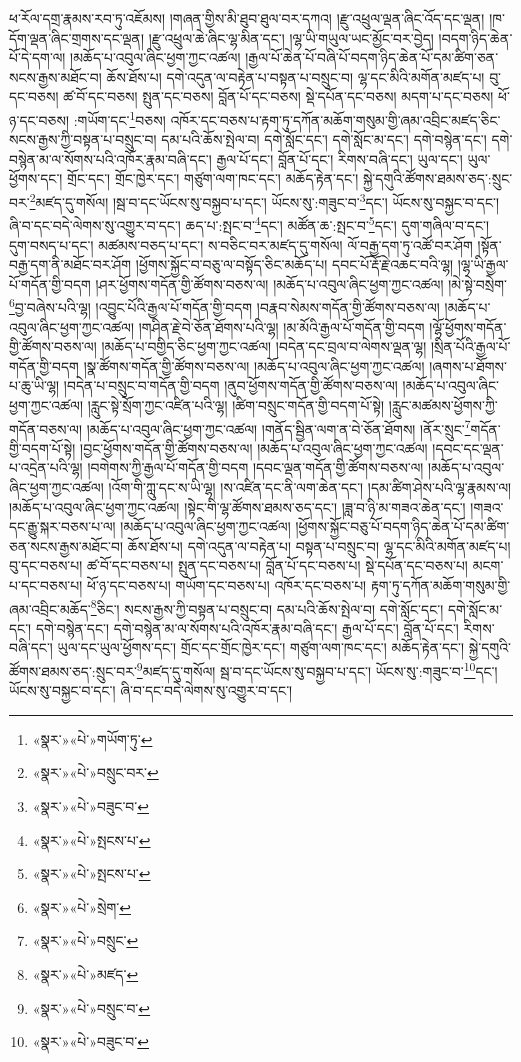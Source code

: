 ཕ་རོལ་དགྲ་རྣམས་རབ་ཏུ་འཇོམས། །གཞན་གྱིས་མི་ཐུབ་ཐུལ་བར་དཀའ། །རྫུ་འཕྲུལ་ལྡན་ཞིང་འོད་དང་ལྡན། །ཁ་དོག་ལྡན་ཞིང་གྲགས་དང་ལྡན། །རྫུ་འཕྲུལ་ཆེ་ཞིང་ལྷ་མིན་དང་། །ལྷ་ཡི་གཡུལ་ཡང་མྱོང་བར་བྱེད། །བདག་ཉིད་ཆེན་པོ་དེ་དག་ལ། །མཆོད་པ་འབུལ་ཞིང་ཕྱག་ཀྱང་འཚལ། །རྒྱལ་པོ་ཆེན་པོ་བཞི་པོ་བདག་ཉིད་ཆེན་པོ་དམ་ཚིག་ཅན་སངས་རྒྱས་མཐོང་བ། ཆོས་ཐོས་པ། དགེ་འདུན་ལ་བརྟེན་པ་བསྟན་པ་བསྲུང་བ། ལྷ་དང་མིའི་མགོན་མཛད་པ། བུ་དང་བཅས། ཚ་བོ་དང་བཅས། སྤུན་དང་བཅས། བློན་པོ་དང་བཅས། སྡེ་དཔོན་དང་བཅས། མདག་པ་དང་བཅས། ཕོ་ཉ་དང་བཅས། :གཡོག་དང་\footnote{«སྣར་»«པེ་»གཡོག་ཏུ་}བཅས། འཁོར་དང་བཅས་པ་རྟག་ཏུ་དཀོན་མཆོག་གསུམ་གྱི་ཞམ་འབྲིང་མཛད་ཅིང་སངས་རྒྱས་ཀྱི་བསྟན་པ་བསྲུང་བ། དམ་པའི་ཆོས་སྤེལ་བ། དགེ་སློང་དང་། དགེ་སློང་མ་དང་། དགེ་བསྙེན་དང་། དགེ་བསྙེན་མ་ལ་སོགས་པའི་འཁོར་རྣམ་བཞི་དང་། རྒྱལ་པོ་དང་། བློན་པོ་དང་། རིགས་བཞི་དང་། ཡུལ་དང་། ཡུལ་ཕྱོགས་དང་། གྲོང་དང་། གྲོང་ཁྱེར་དང་། གཙུག་ལག་ཁང་དང་། མཆོད་རྟེན་དང་། སྐྱེ་དགུའི་ཚོགས་ཐམས་ཅད་:སྲུང་བར་\footnote{«སྣར་»«པེ་»བསྲུང་བར་}མཛད་དུ་གསོལ། །སྦ་བ་དང་ཡོངས་སུ་བསྐྱབ་པ་དང་། ཡོངས་སུ་:གཟུང་བ་\footnote{«སྣར་»«པེ་»བཟུང་བ་}དང་། ཡོངས་སུ་བསྐྱང་བ་དང་། ཞི་བ་དང་བདེ་ལེགས་སུ་འགྱུར་བ་དང་། ཆད་པ་:སྤང་བ་\footnote{«སྣར་»«པེ་»སྤངས་པ་}དང་། མཚོན་ཆ་:སྤང་བ་\footnote{«སྣར་»«པེ་»སྤངས་པ་}དང་། དུག་གཞིལ་བ་དང་། དུག་བསད་པ་དང་། མཚམས་བཅད་པ་དང་། ས་བཅིང་བར་མཛད་དུ་གསོལ། ལོ་བརྒྱ་དག་ཏུ་འཚོ་བར་ཤོག །སྟོན་བརྒྱ་དག་ནི་མཐོང་བར་ཤོག །ཕྱོགས་སྐྱོང་བ་བཅུ་ལ་བསྟོད་ཅིང་མཆོད་པ། དབང་པོ་རྡོ་རྗེ་འཆང་བའི་ལྷ། །ལྷ་ཡི་རྒྱལ་པོ་གདོན་གྱི་བདག །ཤར་ཕྱོགས་གདོན་གྱི་ཚོགས་བཅས་ལ། །མཆོད་པ་འབུལ་ཞིང་ཕྱག་ཀྱང་འཚལ། །མེ་སྟེ་བསྲེག་\footnote{«སྣར་»«པེ་»སྲེག་}བྱ་བཞེས་པའི་ལྷ། །འབྱུང་པོའི་རྒྱལ་པོ་གདོན་གྱི་བདག །བརྣབ་སེམས་གདོན་གྱི་ཚོགས་བཅས་ལ། །མཆོད་པ་འབུལ་ཞིང་ཕྱག་ཀྱང་འཚལ། །གཤིན་རྗེ་བེ་ཅོན་ཐོགས་པའི་ལྷ། །མ་མོའི་རྒྱལ་པོ་གདོན་གྱི་བདག །ལྷོ་ཕྱོགས་གདོན་གྱི་ཚོགས་བཅས་ལ། །མཆོད་པ་བགྱིད་ཅིང་ཕྱག་ཀྱང་འཚལ། །བདེན་དང་བྲལ་བ་ལེགས་ལྡན་ལྷ། །སྲིན་པོའི་རྒྱལ་པོ་གདོན་གྱི་བདག །སྣ་ཚོགས་གདོན་གྱི་ཚོགས་བཅས་ལ། །མཆོད་པ་འབུལ་ཞིང་ཕྱག་ཀྱང་འཚལ། །ཞགས་པ་ཐོགས་པ་ཆུ་ཡི་ལྷ། །བདེན་པ་བསྲུང་བ་གདོན་གྱི་བདག །ནུབ་ཕྱོགས་གདོན་གྱི་ཚོགས་བཅས་ལ། །མཆོད་པ་འབུལ་ཞིང་ཕྱག་ཀྱང་འཚལ། །རླུང་སྟེ་སྲོག་ཀྱང་འཛིན་པའི་ལྷ། །ཚིག་བསྲུང་གདོན་གྱི་བདག་པོ་སྟེ། །རླུང་མཚམས་ཕྱོགས་ཀྱི་གདོན་བཅས་ལ། །མཆོད་པ་འབུལ་ཞིང་ཕྱག་ཀྱང་འཚལ། །གནོད་སྦྱིན་ལག་ན་བེ་ཅོན་ཐོགས། །ནོར་སྲུང་\footnote{«སྣར་»«པེ་»བསྲུང་}གདོན་གྱི་བདག་པོ་སྟེ། །བྱང་ཕྱོགས་གདོན་གྱི་ཚོགས་བཅས་ལ། །མཆོད་པ་འབུལ་ཞིང་ཕྱག་ཀྱང་འཚལ། །དབང་དང་ལྡན་པ་འདྲེན་པའི་ལྷ། །བགེགས་ཀྱི་རྒྱལ་པོ་གདོན་གྱི་བདག །དབང་ལྡན་གདོན་གྱི་ཚོགས་བཅས་ལ། །མཆོད་པ་འབུལ་ཞིང་ཕྱག་ཀྱང་འཚལ། །འོག་གི་ཀླུ་དང་ས་ཡི་ལྷ། །ས་འཛིན་དང་ནི་ལག་ཆེན་དང་། །དམ་ཚིག་ཤེས་པའི་ལྷ་རྣམས་ལ། །མཆོད་པ་འབུལ་ཞིང་ཕྱག་ཀྱང་འཚལ། །སྟེང་གི་ལྷ་ཚོགས་ཐམས་ཅད་དང་། །ཟླ་བ་ཉི་མ་གཟའ་ཆེན་དང་། །གཟའ་དང་རྒྱུ་སྐར་བཅས་པ་ལ། །མཆོད་པ་འབུལ་ཞིང་ཕྱག་ཀྱང་འཚལ། །ཕྱོགས་སྐྱོང་བཅུ་པོ་བདག་ཉིད་ཆེན་པོ་དམ་ཚིག་ཅན་སངས་རྒྱས་མཐོང་བ། ཆོས་ཐོས་པ། དགེ་འདུན་ལ་བརྟེན་པ། བསྟན་པ་བསྲུང་བ། ལྷ་དང་མིའི་མགོན་མཛད་པ། བུ་དང་བཅས་པ། ཚ་བོ་དང་བཅས་པ། སྤུན་དང་བཅས་པ། བློན་པོ་དང་བཅས་པ། སྡེ་དཔོན་དང་བཅས་པ། མངག་པ་དང་བཅས་པ། ཕོ་ཉ་དང་བཅས་པ། གཡོག་དང་བཅས་པ། འཁོར་དང་བཅས་པ། རྟག་ཏུ་དཀོན་མཆོག་གསུམ་གྱི་ཞམ་འབྲིང་མཆོད་\footnote{«སྣར་»«པེ་»མཛད་}ཅིང་། སངས་རྒྱས་ཀྱི་བསྟན་པ་བསྲུང་བ། དམ་པའི་ཆོས་སྤེལ་བ། དགེ་སློང་དང་། དགེ་སློང་མ་དང་། དགེ་བསྙེན་དང་། དགེ་བསྙེན་མ་ལ་སོགས་པའི་འཁོར་རྣམ་བཞི་དང་། རྒྱལ་པོ་དང་། བློན་པོ་དང་། རིགས་བཞི་དང་། ཡུལ་དང་ཡུལ་ཕྱོགས་དང་། གྲོང་དང་གྲོང་ཁྱེར་དང་། གཙུག་ལག་ཁང་དང་། མཆོད་རྟེན་དང་། སྐྱེ་དགུའི་ཚོགས་ཐམས་ཅད་:སྲུང་བར་\footnote{«སྣར་»«པེ་»བསྲུང་བ་}མཛད་དུ་གསོལ། སྦ་བ་དང་ཡོངས་སུ་བསྐྱབ་པ་དང་། ཡོངས་སུ་:གཟུང་བ་\footnote{«སྣར་»«པེ་»བཟུང་བ་}དང་། ཡོངས་སུ་བསྐྱང་བ་དང་། ཞི་བ་དང་བདེ་ལེགས་སུ་འགྱུར་བ་དང་། 